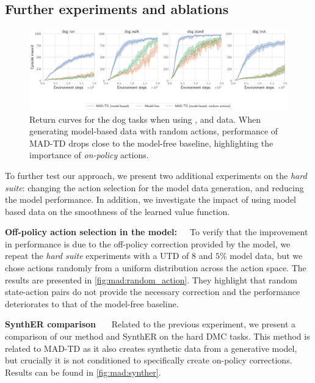 \subsection{Further experiments and ablations}
\label{sec:mad:adv_robustness}
\begin{figure}[t]
    \centering
    \includegraphics[width=1.\linewidth]{figures/mad-td/dog_random_actions.pdf}
    \caption{Return curves for the dog tasks when using ,   and   data. When generating model-based data with random actions, performance of MAD-TD drops close to the model-free baseline, highlighting the importance of \emph{on-policy} actions.}
    \label{fig:mad:random_action}
\end{figure}

To further test our approach, we present two additional experiments on the \emph{hard suite}: changing the action selection for the model data generation, and reducing the model performance.
In addition, we investigate the impact of using model based data on the smoothness of the learned value function.

\textbf{Off-policy action selection in the model:}~~~To verify that the  improvement in performance is due to the off-policy correction provided by the model, we repeat the \emph{hard suite} experiments with a UTD of $8$ and $5\%$ model data, but we chose actions randomly from a uniform distribution across the action space.
The results are presented in \autoref{fig:mad:random_action}.
They highlight that random state-action pairs do not provide the necessary correction and the performance deteriorates to that of the model-free baseline.

\textbf{SynthER comparison}~~~
Related to the previous experiment, we present a comparison of our method and SynthER on the hard DMC tasks.
This method is related to MAD-TD as it also creates synthetic data from a generative model, but crucially it is not conditioned to specifically create on-policy corrections.
Results can be found in \autoref{fig:mad:synther}.

